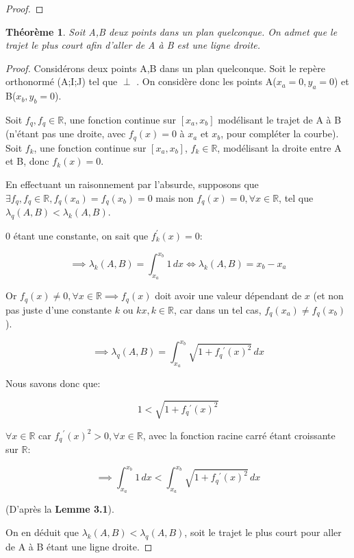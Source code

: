 \documentclass{amsart}
\newtheorem{theorem}{Théorème}[section]
\theoremstyle{definition}
\theoremstyle{remark}
\numberwithin{equation}{section}
\renewcommand*{\overrightarrow}[1]{\vbox{\halign{##\cr 
  \tiny\rightarrowfill\cr\noalign{\nointerlineskip\vskip1pt} 
  $#1\mskip2mu$\cr}}}
\begin{document}
\begin{proof}
  
\end{proof}

\begin{theorem}
  Soit A,B deux points dans un plan quelconque. On admet que le trajet le plus court afin d'aller de A à B est une ligne droite.
\end{theorem}

\begin{proof}
  Considérons deux points A,B dans un plan quelconque. Soit le repère orthonormé (A;I;J) tel que \overrightarrow{AJ} $\perp$ \overrightarrow{AB}. On considère donc les points A($x_a=0,y_a=0$) et B($x_b,y_b=0$).
  
  Soit $f_q, f_q\in\mathbb{R}$, une fonction continue sur $[x_a,x_b]$ modélisant le trajet de A à B (n'étant pas une droite, avec $f_q(x)=0$ à $x_a$ et $x_b$, pour compléter la courbe). Soit $f_k$, une fonction
  continue sur $[x_a,x_b]$, $f_k\in\mathbb{R}$, modélisant la droite entre A et B, donc $f_k(x)=0$.
  
  En effectuant un raisonnement par l'absurde, supposons que $\exists f_q,f_q\in\mathbb{R},f_q(x_a)=f_q(x_b)=0$ mais non $f_q(x)=0, \forall x\in\mathbb{R}$, tel que $\lambda_q(A,B) < \lambda_k(A,B)$.

  $0$ étant une constante, on sait que $f_k^\prime(x)=0$:

  \[\implies \lambda_k(A,B)=\int_{x_a}^{x_b}1 \,dx \iff \lambda_k(A,B)= x_b-x_a \]

  Or $f_q(x)\ne 0,\forall x\in\mathbb{R} \implies f_q(x)$ doit avoir une valeur dépendant de $x$ (et non pas juste d'une constante $k$ ou $kx, k\in\mathbb{R}$, car dans un tel cas, $f_q(x_a)\ne f_q(x_b)$). 

  \[\implies \lambda_q(A,B)=\int_{x_a}^{x_b}\sqrt{1+f_q{^\prime}(x)^2} \,dx\]

  Nous savons donc que: 

  \[1 < \sqrt{1+f_q{^\prime}(x)^2}\] 
  
  $\forall x \in \mathbb{R}$ car $f_q{^\prime}(x)^2> 0, \forall x \in \mathbb{R}$, avec la fonction racine carré étant croissante sur $\mathbb{R}$:

  \[\implies \int_{x_a}^{x_b}1 \,dx < \int_{x_a}^{x_b}\sqrt{1+f_q{^\prime}(x)^2} \,dx\] 
  
  (D'après la \textbf{Lemme 3.1}).

  On en déduit que $\lambda_k(A,B) < \lambda_q(A,B)$, soit le trajet le plus court pour aller de A à B étant une ligne droite.
\end{proof}
\end{document}
